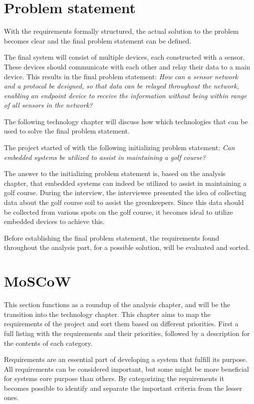 \chapter{Problem statement}
With the requirements formally structured, the actual solution to the problem becomes clear and the final problem statement can be defined.

The final system will consist of multiple devices, each constructed with a sensor. These devices should communicate with each other and relay their data to a main device. This results in the final problem statement:
\textit{How can a sensor network and a protocol be designed, so that data can be relayed throughout the network, enabling an endpoint device to receive the information without being within range of all sensors in the network?}

The following technology chapter will discuss how which technologies that can be used to solve the final problem statement.

The project started of with the following initializing problem statement:
\textit{Can embedded systems be utilized to assist in maintaining a golf course?}

The answer to the initializing problem statement is, based on the analysis chapter, that embedded systems can indeed be utilized to assist in maintaining a golf course. During the interview, the interviewee presented the idea of collecting data about the golf course soil to assist the greenkeepers. Since this data should be collected from various spots on the golf course, it becomes ideal to utilize embedded devices to achieve this.

Before establishing the final problem statement, the requirements found throughout the analysis part, for a possible solution, will be evaluated and sorted.

\chapter{MoSCoW}
This section functions as a roundup of the analysis chapter, and will be the transition into the technology chapter. This chapter aims to map the requirements of the project and sort them based on different priorities. First a full listing with the requirements and their priorities, followed by a description for the contents of each category.

Requirements are an essential part of developing a system that fulfill its purpose. All requirements can be considered important, but some might be more beneficial for systems core purpose than others. By categorizing the requirements it becomes possible to identify and separate the important criteria from the lesser ones. 

